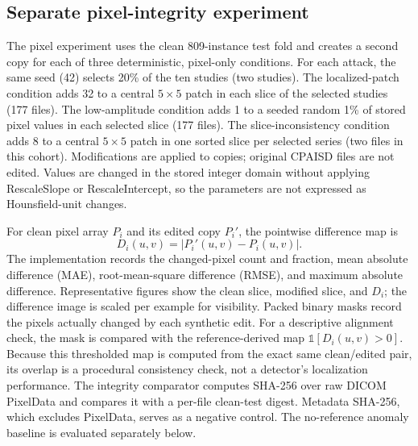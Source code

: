 \documentclass[journal]{IEEEtran}
\begin{document}
  \subsection{Separate pixel-integrity experiment}
  The pixel experiment uses the clean 809-instance test fold and creates a second copy for each of three deterministic, pixel-only conditions. For each attack, the same seed (42) selects 20\% of the ten studies (two studies). The localized-patch condition adds 32 to a central $5\times5$ patch in each slice of the selected studies (177 files). The low-amplitude condition adds 1 to a seeded random 1\% of stored pixel values in each selected slice (177 files). The slice-inconsistency condition adds 8 to a central $5\times5$ patch in one sorted slice per selected series (two files in this cohort). Modifications are applied to copies; original CPAISD files are not edited. Values are changed in the stored integer domain without applying RescaleSlope or RescaleIntercept, so the parameters are not expressed as Hounsfield-unit changes.
  
  For clean pixel array $P_i$ and its edited copy $P_i'$, the pointwise difference map is
  \begin{equation}
  D_i(u,v)=\left|P_i'(u,v)-P_i(u,v)\right|.
  \end{equation}
  The implementation records the changed-pixel count and fraction, mean absolute difference (MAE), root-mean-square difference (RMSE), and maximum absolute difference. Representative figures show the clean slice, modified slice, and $D_i$; the difference image is scaled per example for visibility. Packed binary masks record the pixels actually changed by each synthetic edit. For a descriptive alignment check, the mask is compared with the reference-derived map $\mathbb{1}[D_i(u,v)>0]$. Because this thresholded map is computed from the exact same clean/edited pair, its overlap is a procedural consistency check, not a detector's localization performance. The integrity comparator computes SHA-256 over raw DICOM PixelData and compares it with a per-file clean-test digest. Metadata SHA-256, which excludes PixelData, serves as a negative control. The no-reference anomaly baseline is evaluated separately below.
  
\end{document}
